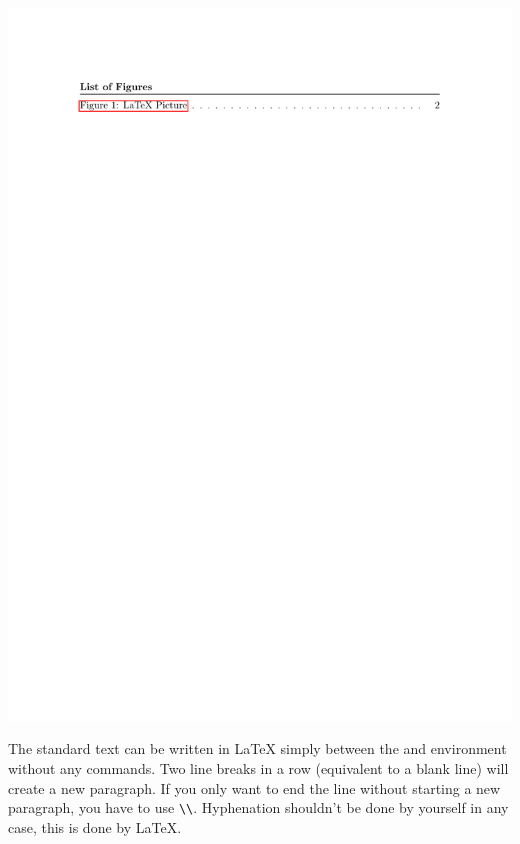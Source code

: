 \begin{myFIG}{}
	\includegraphics[page=1,scale=0.24]{examples/zz_bsp_file_LOF.pdf}
\end{myFIG}

\justifying

The standard text can be written in LaTeX simply between the \Verb|| and \Verb|| environment without any commands. Two line breaks in a row (equivalent to a blank line) will create a new paragraph. If you only want to end the line without starting a new paragraph, you have to use \Verb|\\|. Hyphenation shouldn't be done by yourself in any case, this is done by \LaTeX.